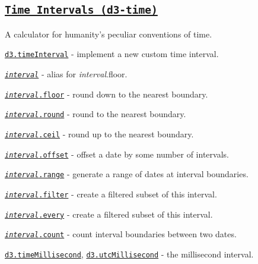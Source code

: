 \subsection*{\href{https://github.com/d3/d3-time}{\tt Time Intervals (d3-\/time)}}

A calculator for humanity’s peculiar conventions of time.


\begin{DoxyItemize}
\item \href{https://github.com/d3/d3-time/blob/master/README.md#timeInterval}{\tt d3.\+time\+Interval} -\/ implement a new custom time interval.
\item \href{https://github.com/d3/d3-time/blob/master/README.md#_interval}{\tt {\itshape interval}} -\/ alias for {\itshape interval}.floor.
\item \href{https://github.com/d3/d3-time/blob/master/README.md#interval_floor}{\tt {\itshape interval}.floor} -\/ round down to the nearest boundary.
\item \href{https://github.com/d3/d3-time/blob/master/README.md#interval_round}{\tt {\itshape interval}.round} -\/ round to the nearest boundary.
\item \href{https://github.com/d3/d3-time/blob/master/README.md#interval_ceil}{\tt {\itshape interval}.ceil} -\/ round up to the nearest boundary.
\item \href{https://github.com/d3/d3-time/blob/master/README.md#interval_offset}{\tt {\itshape interval}.offset} -\/ offset a date by some number of intervals.
\item \href{https://github.com/d3/d3-time/blob/master/README.md#interval_range}{\tt {\itshape interval}.range} -\/ generate a range of dates at interval boundaries.
\item \href{https://github.com/d3/d3-time/blob/master/README.md#interval_filter}{\tt {\itshape interval}.filter} -\/ create a filtered subset of this interval.
\item \href{https://github.com/d3/d3-time/blob/master/README.md#interval_every}{\tt {\itshape interval}.every} -\/ create a filtered subset of this interval.
\item \href{https://github.com/d3/d3-time/blob/master/README.md#interval_count}{\tt {\itshape interval}.count} -\/ count interval boundaries between two dates.
\item \href{https://github.com/d3/d3-time/blob/master/README.md#timeMillisecond}{\tt d3.\+time\+Millisecond}, \href{https://github.com/d3/d3-time/blob/master/README.md#timeMillisecond}{\tt d3.\+utc\+Millisecond} -\/ the millisecond interval.

\end{DoxyItemize}

